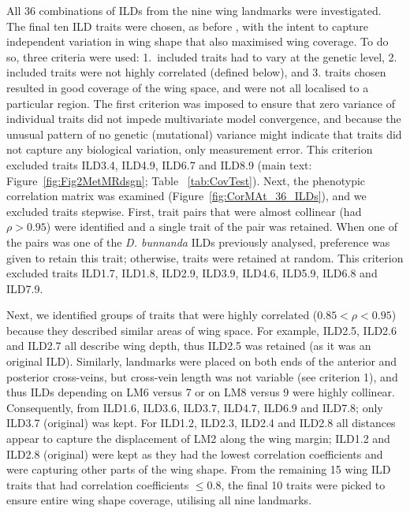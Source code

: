 All 36 combinations of ILDs from the nine wing landmarks were investigated. The final ten ILD traits were chosen, as before \citep{McGu07}, with the intent to capture independent variation in wing shape that also maximised wing coverage. To do so, three criteria were used: 1.~included traits had to vary at the genetic level, 2. included traits were not highly correlated (defined below), and 3. traits chosen resulted in good coverage of the wing space, and were not all localised to a particular region. The first criterion was imposed to ensure that zero variance of individual traits did not impede multivariate model convergence, and because the unusual pattern of no genetic (mutational) variance might indicate that traits did not capture any biological variation, only measurement error. This criterion excluded traits ILD3.4, ILD4.9, ILD6.7 and ILD8.9 (main text: Figure~\ref{fig:Fig2MetMRdsgn}; Table ~\ref{tab:CovTest}). Next, the phenotypic correlation matrix was examined (Figure~\ref{fig:CorMAt_36_ILDs}), and we excluded traits stepwise. First, trait pairs that were almost collinear (had $\rho > 0.95$) were identified and a single trait of the pair was retained. When one of the pairs was one of the \textit{D. bunnanda} ILDs previously analysed, preference was given to retain this trait; otherwise, traits were retained at random. This criterion excluded traits ILD1.7, ILD1.8, ILD2.9, ILD3.9, ILD4.6, ILD5.9, ILD6.8 and ILD7.9.\par

Next, we identified groups of traits that were highly correlated ($0.85<\rho<0.95$) because they described similar areas of wing space. For example, ILD2.5, ILD2.6 and ILD2.7 all describe wing depth, thus ILD2.5 was retained (as it was an original ILD). Similarly, landmarks were placed on both ends of the anterior and posterior cross-veins, but cross-vein length was not variable (see criterion 1), and thus ILDs depending on LM6 versus 7 or on LM8 versus 9 were highly collinear. Consequently, from ILD1.6, ILD3.6, ILD3.7, ILD4.7, ILD6.9 and ILD7.8; only ILD3.7 (original) was kept. For ILD1.2, ILD2.3, ILD2.4 and ILD2.8 all distances appear to capture the displacement of LM2 along the wing margin; ILD1.2 and ILD2.8 (original) were kept as they had the lowest correlation coefficients and were capturing other parts of the wing shape. From the remaining 15 wing ILD traits that had correlation coefficients $\leq 0.8$, the final 10 traits were picked to ensure entire wing shape coverage, utilising all nine landmarks.\par

